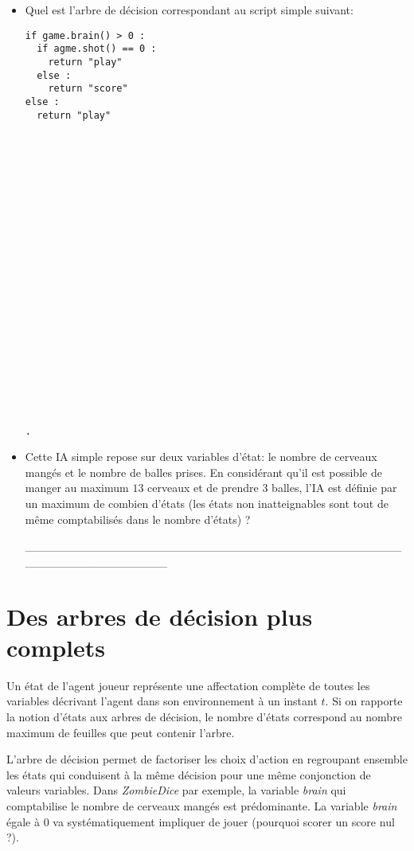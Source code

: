 \documentclass[a4paper, 10pt]{article}
\begin{document}
\begin{itemize}[$\bigcirc$]
\item Quel est l'arbre de décision correspondant au script simple suivant:
\begin{lstlisting}[caption={Script 2 variables}]
if game.brain() > 0 :
  if agme.shot() == 0 :
    return "play"
  else :
    return "score"
else :
  return "play"
\end{lstlisting}

\begin{lstlisting}[caption={Arbre de Decision}]






















.
\end{lstlisting}

\item Cette IA simple repose sur deux variables d'état: le nombre de cerveaux mangés et le nombre de balles prises. En considérant qu'il est possible de manger au maximum $13$ cerveaux et de prendre $3$ balles, l'IA est définie par un maximum de combien d'états (les états non inatteignables sont tout de même comptabilisés dans le nombre d'états) ?

\medskip

\_\_\_\_\_\_\_\_\_\_\_\_\_\_\_\_\_\_\_\_\_\_\_\_\_\_\_\_\_\_\_\_\_\_\_\_\_\_\_\_\_\_\_\_\_\_\_\_\_\_\_\_\_\_\_\_\_\_\_\_\_\_


\end{itemize}


\section{Des arbres de décision plus complets}%

  Un état de l'agent joueur représente une affectation complète de toutes les variables décrivant l'agent dans son environnement à un instant $\mathit{t}$.
  Si on rapporte la notion d'états aux arbres de décision, le nombre d'états correspond au nombre maximum de feuilles que peut contenir l'arbre.

  L'arbre de décision permet de factoriser les choix d'action en regroupant ensemble les états qui conduisent à la même décision pour une même conjonction de valeurs variables.
  Dans \emph{ZombieDice} par exemple, la variable \emph{brain} qui comptabilise le nombre de cerveaux mangés est prédominante. La variable \emph{brain} égale à $0$ va systématiquement impliquer de jouer (pourquoi scorer un score nul ?).
\end{document}
